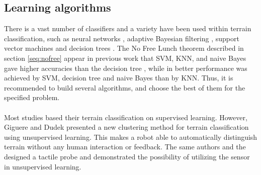 \documentclass[USenglish]{ifimaster}  %
\begin{document}
\subsection{Learning algorithms}
There is a vast number of classifiers and a variety have been used within terrain classification, such as neural networks \cite{6784609,5752869,4654717}, adaptive Bayesian filtering  \cite{5152327,6849778}, support vector machines \cite{5602459,4161556,4059113} and decision trees  \cite{6849778}. The No Free Lunch theorem described in section \ref{seq:nofree} appear in previous work that SVM, KNN, and naive Bayes gave higher accuracies than the decision tree \cite{DBLP:conf/emcr/WeissFSZ07}, while in \cite{6849778} better performance was achieved by SVM, decision tree and naive Bayes than by KNN. Thus, it is recommended to build several algorithms, and choose the best of them for the specified problem. 
\\
\\
Most studies based their terrain classification on supervised learning. However, Giguere and Dudek \cite{Giguere2009} presented a new clustering method for terrain classification using unsupervised learning. This makes a robot able to automatically distinguish terrain without any human interaction or feedback. The same authors \cite{5752869} and the designed a tactile probe and demonstrated the possibility of utilizing the sensor in unsupervised learning. 
	
\end{document}
